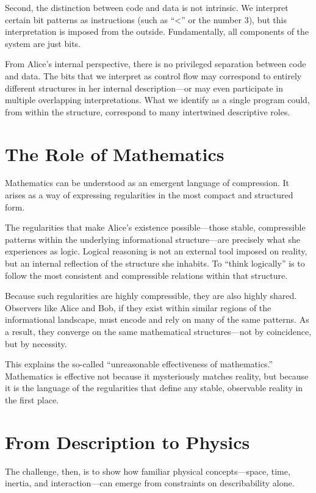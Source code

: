 Second, the distinction between code and data is not intrinsic. We interpret certain bit patterns as instructions (such as “<” or the number 3), but this interpretation is imposed from the outside. Fundamentally, all components of the system are just bits.

From Alice’s internal perspective, there is no privileged separation between code and data. The bits that we interpret as control flow may correspond to entirely different structures in her internal description—or may even participate in multiple overlapping interpretations. What we identify as a single program could, from within the structure, correspond to many intertwined descriptive roles. 


\section*{The Role of Mathematics}

Mathematics can be understood as an emergent language of compression. It arises as a way of expressing regularities in the most compact and structured form.

The regularities that make Alice’s existence possible—those stable, compressible patterns within the underlying informational structure—are precisely what she experiences as logic. Logical reasoning is not an external tool imposed on reality, but an internal reflection of the structure she inhabits. To “think logically” is to follow the most consistent and compressible relations within that structure.

Because such regularities are highly compressible, they are also highly shared. Observers like Alice and Bob, if they exist within similar regions of the informational landscape, must encode and rely on many of the same patterns. As a result, they converge on the same mathematical structures—not by coincidence, but by necessity.

This explains the so-called “unreasonable effectiveness of mathematics.” Mathematics is effective not because it mysteriously matches reality, but because it is the language of the regularities that define any stable, observable reality in the first place.


\section{From Description to Physics}

The challenge, then, is to show how familiar physical concepts—space, time, inertia, and interaction—can emerge from constraints on describability alone.


